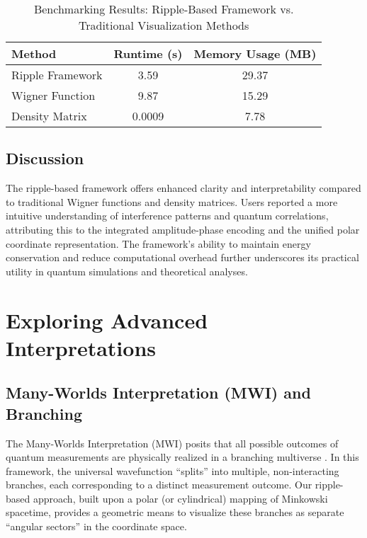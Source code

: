 \documentclass{article}
\begin{document}
\begin{table}[H]
\centering
\caption{Benchmarking Results: Ripple-Based Framework vs. Traditional Visualization Methods}
\begin{tabular}{|l|c|c|}
    \hline
    \textbf{Method} & \textbf{Runtime (s)} & \textbf{Memory Usage (MB)} \\
    \hline
    Ripple Framework    & 3.59        & 29.37             \\
    Wigner Function     & 9.87        & 15.29             \\
    Density Matrix      & 0.0009      & 7.78              \\
    \hline
\end{tabular}
\label{tab:benchmark_methods}
\end{table}

\subsection{Discussion}

The ripple-based framework offers enhanced clarity and interpretability compared to traditional Wigner functions and density matrices. Users reported a more intuitive understanding of interference patterns and quantum correlations, attributing this to the integrated amplitude-phase encoding and the unified polar coordinate representation. The framework’s ability to maintain energy conservation and reduce computational overhead further underscores its practical utility in quantum simulations and theoretical analyses.

\section{Exploring Advanced Interpretations}
\label{sec:exploring_advanced_interpretations}

\subsection{Many-Worlds Interpretation (MWI) and Branching}

The Many-Worlds Interpretation (MWI) posits that all possible outcomes of quantum measurements are physically realized in a branching multiverse \citep{everett1957}. In this framework, the universal wavefunction “splits” into multiple, non-interacting branches, each corresponding to a distinct measurement outcome. Our ripple-based approach, built upon a polar (or cylindrical) mapping of Minkowski spacetime, provides a geometric means to visualize these branches as separate “angular sectors” in the coordinate space.
\end{document}
